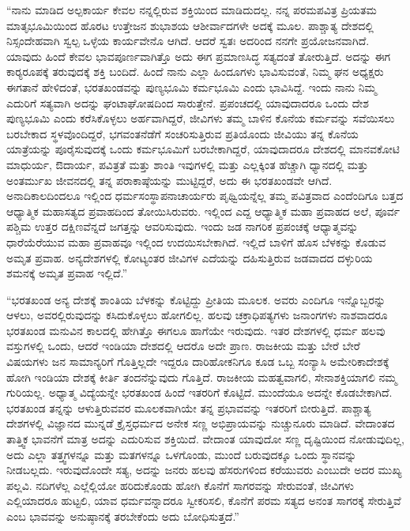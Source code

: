  “ನಾನು ಮಾಡಿದ ಅಲ್ಪಕಾರ್ಯ ಕೇವಲ ನನ್ನಲ್ಲಿರುವ ಶಕ್ತಿಯಿಂದ ಮಾಡಿದುದಲ್ಲ. ನನ್ನ ಪರಮಪವಿತ್ರ ಪ್ರಿಯತಮ ಮಾತೃಭೂಮಿಯಿಂದ ಹೊರಟ ಉತ್ತೇಜನ ಶುಭಾಶಯ ಆಶೀರ್ವಾದಗಳೇ ಅದಕ್ಕೆ ಮೂಲ. ಪಾಶ್ಚಾತ್ಯ ದೇಶದಲ್ಲಿ ನಿಸ್ಸಂದೇಹವಾಗಿ ಸ್ವಲ್ಪ ಒಳ್ಳೆಯ ಕಾರ್ಯವೇನೊ ಆಗಿದೆ. ಆದರೆ ಸ್ವತಃ ಅದರಿಂದ ನನಗೇ ಪ್ರಯೋಜನವಾಗಿದೆ. ಯಾವುದು ಹಿಂದೆ ಕೇವಲ ಭಾವಪೂರ್ಣವಾಗಿತ್ತೊ ಅದು ಈಗ ಪ್ರಮಾಣಸಿದ್ಧ ಸತ್ಯದಂತೆ ತೋರುತ್ತಿದೆ. ಅದನ್ನು ಈಗ ಕಾರ‍್ಯ‍ರೂಪಕ್ಕೆ ತರುವುದಕ್ಕೆ ಶಕ್ತಿ ಬಂದಿದೆ. ಹಿಂದೆ ನಾನು ಎಲ್ಲಾ ಹಿಂದೂಗಳು ಭಾವಿಸುವಂತೆ, ನಿಮ್ಮ ಘನ ಅಧ್ಯಕ್ಷರು ಈಗತಾನೆ ಹೇಳಿದಂತೆ, ಭರತಖಂಡವನ್ನು ಪುಣ್ಯಭೂಮಿ ಕರ್ಮಭೂಮಿ ಎಂದು ಭಾವಿಸಿದ್ದೆ. ಇಂದು ನಾನು ನಿಮ್ಮ ಎದುರಿಗೆ ಸತ್ಯವಾಗಿ ಅದನ್ನು ಘಂಟಾಘೋಷದಿಂದ ಸಾರುತ್ತೇನೆ. ಪ್ರಪಂಚದಲ್ಲಿ ಯಾವುದಾದರೂ ಒಂದು ದೇಶ ಪುಣ್ಯಭೂಮಿ ಎಂದು ಕರೆಸಿಕೊಳ್ಳಲು ಅರ್ಹವಾಗಿದ್ದರೆ, ಜೀವಿಗಳು ತಮ್ಮ ಬಾಳಿನ ಕೊನೆಯ ಕರ್ಮವನ್ನು ಸವೆಯಿಸಲು ಬರಬೇಕಾದ ಸ್ಥಳವೊಂದಿದ್ದರೆ, ಭಗವಂತನೆಡೆಗೆ ಸಂಚರಿಸುತ್ತಿರುವ ಪ್ರತಿಯೊಂದು ಜೀವಿಯು ತನ್ನ ಕೊನೆಯ ಯಾತ್ರೆಯನ್ನು ಪೂರೈಸುವುದಕ್ಕೆ ಒಂದು ಕರ್ಮಭೂಮಿಗೆ ಬರಬೇಕಾಗಿದ್ದರೆ, ಯಾವುದಾದರೂ ದೇಶದಲ್ಲಿ ಮಾನವಕೋಟಿ ಮಾಧುರ್ಯ, ಔದಾರ್ಯ, ಪವಿತ್ರತೆ ಮತ್ತು ಶಾಂತಿ ಇವುಗಳಲ್ಲಿ ಮತ್ತು ಎಲ್ಲಕ್ಕಿಂತ ಹೆಚ್ಚಾಗಿ ಧ್ಯಾನದಲ್ಲಿ ಮತ್ತು ಅಂತರ್ಮುಖ ಜೀವನದಲ್ಲಿ ತನ್ನ ಪರಾಕಾಷ್ಠೆಯನ್ನು ಮುಟ್ಟಿದ್ದರೆ, ಅದು ಈ ಭರತಖಂಡವೇ ಆಗಿದೆ. ಅನಾದಿಕಾಲದಿಂದಲೂ ಇಲ್ಲಿಂದ ಧರ್ಮಸಂಸ್ಥಾಪನಾಚಾರ್ಯರು ಪೃಥ್ವಿಯನ್ನೆಲ್ಲ ತಮ್ಮ ಪವಿತ್ರವಾದ ಎಂದೆಂದಿಗೂ ಬತ್ತದ ಆಧ್ಯಾತ್ಮಿಕ ಮಹಾಸತ್ಯದ ಪ್ರವಾಹದಿಂದ ತೋಯಿಸಿರುವರು. ಇಲ್ಲಿಂದ ಎದ್ದ ಆಧ್ಯಾತ್ಮಿಕ ಮಹಾ ಪ್ರವಾಹದ ಅಲೆ, ಪೂರ್ವ ಪಶ್ಚಿಮ ಉತ್ತರ ದಕ್ಷಿಣವೆನ್ನದೆ ಜಗತ್ತನ್ನು ಆವರಿಸುವುದು. ಇಂದು ಜಡ ನಾಗರಿಕ ಪ್ರಪಂಚಕ್ಕೆ ಆಧ್ಯಾತ್ಮವನ್ನು ಧಾರೆಯೆರೆಯುವ ಮಹಾ ಪ್ರವಾಹವೂ ಇಲ್ಲಿಂದ ಉದಯಿಸಬೇಕಾಗಿದೆ. ಇಲ್ಲಿದೆ ಬಾಳಿಗೆ ಹೊಸ ಬೆಳಕನ್ನು ಕೊಡುವ ಅಮೃತ ಪ್ರವಾಹ. ಅನ್ಯದೇಶಗಳಲ್ಲಿ ಕೋಟ್ಯಂತರ ಜೀವಿಗಳ ಎದೆಯನ್ನು ದಹಿಸುತ್ತಿರುವ ಜಡವಾದದ ದಳ್ಳುರಿಯ ಶಮನಕ್ಕೆ ಅಮೃತ ಪ್ರವಾಹ ಇಲ್ಲಿದೆ.” 

 “ಭರತಖಂಡ ಅನ್ಯ ದೇಶಕ್ಕೆ ಶಾಂತಿಯ ಬೆಳಕನ್ನು ಕೊಟ್ಟಿದ್ದು ಪ್ರೀತಿಯ ಮೂಲಕ. ಅವರು ಎಂದಿಗೂ ಇನ್ನೊಬ್ಬರನ್ನು ಆಳಲು, ಅವರಲ್ಲಿರುವುದನ್ನು ಕಸಿದುಕೊಳ್ಳಲು ಹೋಗಲಿಲ್ಲ. ಹಲವು ಚಕ್ರಾಧಿಪತ್ಯಗಳು ಜನಾಂಗಗಳು ನಾಶವಾದರೂ ಭರತಖಂಡ ಮನುವಿನ ಕಾಲದಲ್ಲಿ ಹೇಗಿತ್ತೊ ಈಗಲೂ ಹಾಗೆಯೇ ಇರುವುದು. ಇತರ ದೇಶಗಳಲ್ಲಿ ಧರ್ಮ ಹಲವು ವಸ್ತುಗಳಲ್ಲಿ ಒಂದು, ಆದರೆ ಇಂಡಿಯಾ ದೇಶದಲ್ಲಿ ಆದರೊ ಅದೇ ಪ್ರಾಣ. ರಾಜಕೀಯ ಮತ್ತು ಬೇರೆ ಬೇರೆ ವಿಷಯಗಳು ಜನ ಸಾಮಾನ್ಯರಿಗೆ ಗೊತ್ತಿಲ್ಲದೇ ಇದ್ದರೂ ದಾರಿಹೋಕನಿಗೂ ಕೂಡ ಒಬ್ಬ ಸಂನ್ಯಾಸಿ ಅಮೇರಿಕಾದೇಶಕ್ಕೆ ಹೋಗಿ ಇಂಡಿಯಾ ದೇಶಕ್ಕೆ ಕೀರ್ತಿ ತಂದನೆನ್ನುವುದು ಗೊತ್ತಿದೆ. ರಾಜಕೀಯ ಮಹತ್ವವಾಗಲಿ, ಸೇನಾಶಕ್ತಿಯಾಗಲಿ ನಮ್ಮ ಗುರಿಯಲ್ಲ. ಅಧ್ಯಾತ್ಮ ವಿದ್ಯೆಯನ್ನೇ ಭರತಖಂಡ ಹಿಂದೆ ಇತರರಿಗೆ ಕೊಟ್ಟಿದೆ. ಮುಂದೆಯೂ ಅದನ್ನೇ ಕೊಡಬೇಕಾಗಿದೆ. ಭರತಖಂಡ ತನ್ನನ್ನು ಆಳುತ್ತಿರುವವರ ಮೂಲಕವಾಗಿಯೇ ತನ್ನ ಪ್ರಭಾವವನ್ನು ಇತರರಿಗೆ ಬೀರುತ್ತಿದೆ. ಪಾಶ್ಚಾತ್ಯ ದೇಶಗಳಲ್ಲಿ ವಿಜ್ಞಾನದ ಮುನ್ನಡೆ ಕ್ರೈಸ್ತಧರ್ಮದ ಅನೇಕ ಸಣ್ಣ ಅಭಿಪ್ರಾಯವನ್ನು ನುಚ್ಚುನೂರು ಮಾಡಿದೆ. ವೇದಾಂತದ ತಾತ್ತ್ವಿಕ ಭಾವನೆಗೆ ಮಾತ್ರ ಅದನ್ನು ಎದುರಿಸುವ ಶಕ್ತಿಯಿದೆ. ವೇದಾಂತ ಯಾವುದೋ ಸಣ್ಣ ದೃಷ್ಟಿಯಿಂದ ನೋಡುವುದಿಲ್ಲ, ಅದು ಎಲ್ಲಾ ತತ್ತ್ವಗಳನ್ನೂ ಮತ್ತು ಮತಗಳನ್ನೂ ಒಳಗೊಂಡು, ಮುಂದೆ ಬರುವುದಕ್ಕೂ ಒಂದು ಸ್ಥಾನವನ್ನು ನೀಡಬಲ್ಲದು. ಇರುವುದೊಂದೇ ಸತ್ಯ, ಅದನ್ನು ಜನರು ಹಲವು ಹೆಸರುಗಳಿಂದ ಕರೆಯುವರು ಎಂಬುದೇ ಅದರ ಮುಖ್ಯ ಪಲ್ಲವಿ. ನದಿಗಳೆಲ್ಲ ಎಲ್ಲೆಲ್ಲಿಯೋ ಹರಿದುಕೊಂಡು ಹೋಗಿ ಕೊನೆಗೆ ಸಾಗರವನ್ನು ಸೇರುವಂತೆ, ಜೀವಿಗಳು ಎಲ್ಲಿಯಾದರೂ ಹುಟ್ಟಲಿ, ಯಾವ ಧರ್ಮವನ್ನಾದರೂ ಸ್ವೀಕರಿಸಲಿ, ಕೊನೆಗೆ ಪರಮ ಸತ್ಯದ ಅನಂತ ಸಾಗರಕ್ಕೆ ಸೇರುತ್ತಿವೆ ಎಂಬ ಭಾವವನ್ನು ಅನುಷ್ಠಾನಕ್ಕೆ ತರಬೇಕೆಂದು ಅದು ಬೋಧಿಸುತ್ತದೆ.” 

